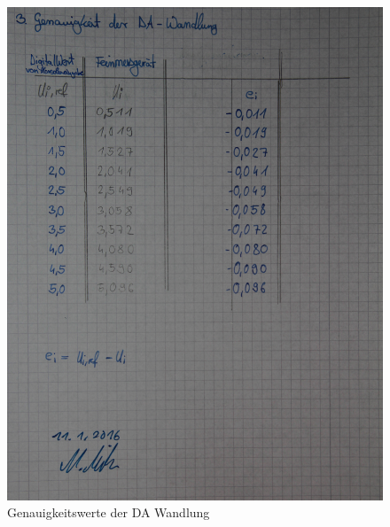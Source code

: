 \documentclass[12pt,oneside,a4paper]{report}
\begin{document}
\begin{figure}[H]
\centering\small
\includegraphics[width=\textwidth]{src/3GenauigkeitsWerteDA.jpg}
\caption{Genauigkeitswerte der DA Wandlung}
\label{fig:DA_WERTE}
\end{figure}

%
%

\end{document}
